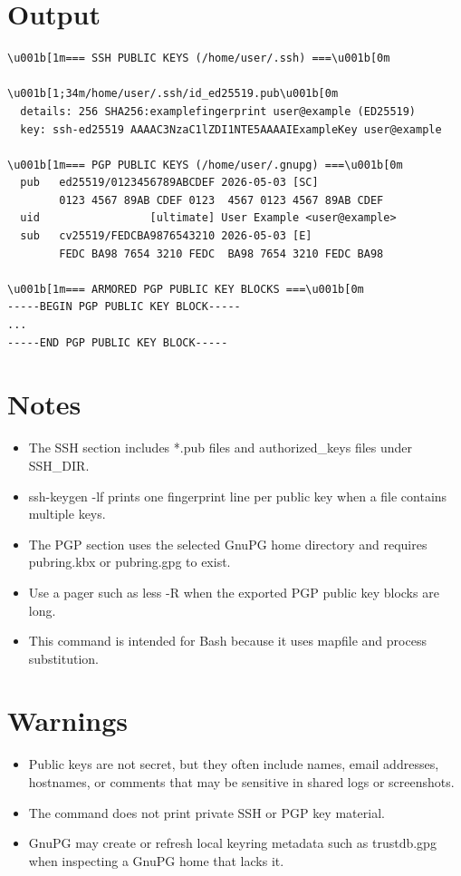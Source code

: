 \documentclass[openany]{book}
\begin{document}
\section*{Output}
\begin{lstlisting}
\u001b[1m=== SSH PUBLIC KEYS (/home/user/.ssh) ===\u001b[0m

\u001b[1;34m/home/user/.ssh/id_ed25519.pub\u001b[0m
  details: 256 SHA256:examplefingerprint user@example (ED25519)
  key: ssh-ed25519 AAAAC3NzaC1lZDI1NTE5AAAAIExampleKey user@example

\u001b[1m=== PGP PUBLIC KEYS (/home/user/.gnupg) ===\u001b[0m
  pub   ed25519/0123456789ABCDEF 2026-05-03 [SC]
        0123 4567 89AB CDEF 0123  4567 0123 4567 89AB CDEF
  uid                 [ultimate] User Example <user@example>
  sub   cv25519/FEDCBA9876543210 2026-05-03 [E]
        FEDC BA98 7654 3210 FEDC  BA98 7654 3210 FEDC BA98

\u001b[1m=== ARMORED PGP PUBLIC KEY BLOCKS ===\u001b[0m
-----BEGIN PGP PUBLIC KEY BLOCK-----
...
-----END PGP PUBLIC KEY BLOCK-----
\end{lstlisting}

\section*{Notes}
\begin{itemize}
  \item The SSH section includes *.pub files and authorized\_keys files under SSH\_DIR.
  \item ssh-keygen -lf prints one fingerprint line per public key when a file contains multiple keys.
  \item The PGP section uses the selected GnuPG home directory and requires pubring.kbx or pubring.gpg to exist.
  \item Use a pager such as less -R when the exported PGP public key blocks are long.
  \item This command is intended for Bash because it uses mapfile and process substitution.
\end{itemize}

\section*{Warnings}
\begin{itemize}
  \item Public keys are not secret, but they often include names, email addresses, hostnames, or comments that may be sensitive in shared logs or screenshots.
  \item The command does not print private SSH or PGP key material.
  \item GnuPG may create or refresh local keyring metadata such as trustdb.gpg when inspecting a GnuPG home that lacks it.
\end{itemize}
\end{document}

